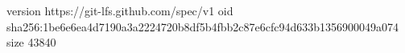 version https://git-lfs.github.com/spec/v1
oid sha256:1be6e6ea4d7190a3a2224720b8df5b4fbb2c87e6cfc94d633b1356900049a074
size 43840
